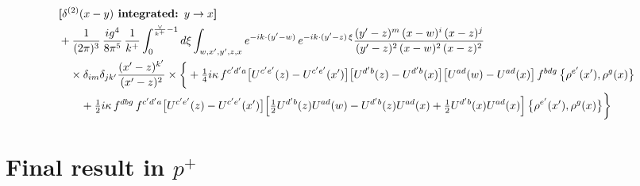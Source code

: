 \documentclass[10pt]{article}
\numberwithin{equation}{section}
\begin{document}
\begin{align}
&\textbf{[$\delta^{(2)}(x-y)$ integrated: $y\to x$]}\notag\\
&+\frac{1}{(2\pi)^{3}}\,\frac{ig^{4}}{8\pi^{5}}\,\frac{1}{k^{+}}\int_{0}^{\frac{\vee}{k^{+}}-1}d\xi\int_{w,x^{\prime},y^{\prime},z,x}e^{-ik\cdot(y^{\prime}-w)}\,e^{-ik\cdot(y^{\prime}-z)\,\xi}\frac{(y^{\prime}-z)^{m}\,(x-w)^{i}\,(x-z)^{j}}{(y^{\prime}-z)^{2}\,(x-w)^{2}\,(x-z)^{2}}\notag\\
&\quad\times\delta_{im}\delta_{jk^{\prime}}\frac{(x^{\prime}-z)^{k^{\prime}}}{(x^{\prime}-z)^{2}}\times\bigg\{+\tfrac14 i\kappa\,f^{c^{\prime}d^{\prime}a}\big[U^{c^{\prime}e^{\prime}}(z)-U^{c^{\prime}e^{\prime}}(x^{\prime})\big]\big[U^{d^{\prime}b}(z)-U^{d^{\prime}b}(x)\big]\big[U^{ad}(w)-U^{ad}(x)\big]\,f^{bdg}\,\big\{\rho^{e^{\prime}}(x^{\prime}),\rho^{g}(x)\big\}\notag\\&\qquad+\tfrac12 i\kappa\,f^{dbg}\,f^{c^{\prime}d^{\prime}a}\big[U^{c^{\prime}e^{\prime}}(z)-U^{c^{\prime}e^{\prime}}(x^{\prime})\big]\Big[\tfrac12U^{d^{\prime}b}(z)U^{ad}(w)-U^{d^{\prime}b}(z)U^{ad}(x)+\tfrac12U^{d^{\prime}b}(x)U^{ad}(x)\Big]\,\big\{\rho^{e^{\prime}}(x^{\prime}),\rho^{g}(x)\big\}\bigg\}
\end{align}
\newpage
\section{Final result in $p^{+}$}
\end{document}
